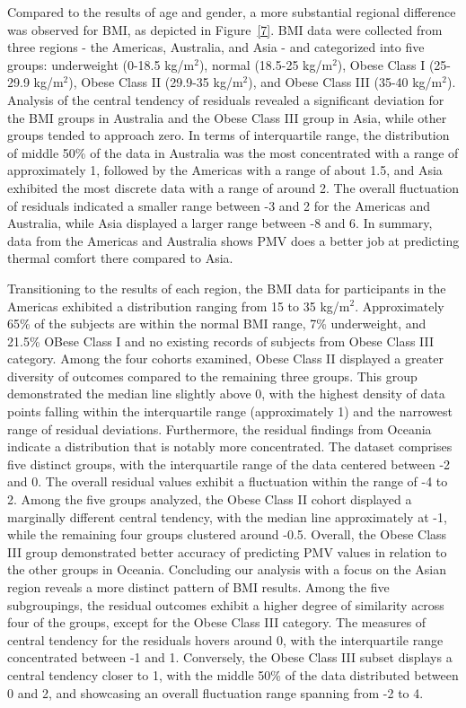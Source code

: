\documentclass[final,3p,times,12pt]{elsarticle}
\begin{document}
Compared to the results of age and gender, a more substantial regional difference was observed for BMI, as depicted in Figure~\ref{7}. BMI data were collected from three regions - the Americas, Australia, and Asia - and categorized into five groups: underweight (0-18.5 kg/m$^2$), normal (18.5-25 kg/m$^2$), Obese Class I (25-29.9 kg/m$^2$), Obese Class II (29.9-35 kg/m$^2$), and Obese Class III (35-40 kg/m$^2$). Analysis of the central tendency of residuals revealed a significant deviation for the BMI groups in Australia and the Obese Class III group in Asia, while other groups tended to approach zero. In terms of interquartile range, the distribution of middle 50\% of the data in Australia was the most concentrated with a range of approximately 1, followed by the Americas with a range of about 1.5, and Asia exhibited the most discrete data with a range of around 2. The overall fluctuation of residuals indicated a smaller range between -3 and 2 for the Americas and Australia, while Asia displayed a larger range between -8 and 6. In summary, data from the Americas and Australia shows PMV does a better job at predicting thermal comfort there compared to Asia.

Transitioning to the results of each region, the BMI data for participants in the Americas exhibited a distribution ranging from 15 to 35 kg/m$^2$. Approximately 65\% of the subjects are within the normal BMI range, 7\% underweight, and 21.5\% OBese Class I and no existing records of subjects from Obese Class III category. Among the four cohorts examined, Obese Class II displayed a greater diversity of outcomes compared to the remaining three groups. This group demonstrated the median line slightly above 0, with the highest density of data points falling within the interquartile range (approximately 1) and the narrowest range of residual deviations. Furthermore, the residual findings from Oceania indicate a distribution that is notably more concentrated. The dataset comprises five distinct groups, with the interquartile range of the data centered between -2 and 0. The overall residual values exhibit a fluctuation within the range of -4 to 2. Among the five groups analyzed, the Obese Class II cohort displayed a marginally different central tendency, with the median line approximately at -1, while the remaining four groups clustered around -0.5. Overall, the Obese Class III group demonstrated better accuracy of predicting PMV values in relation to the other groups in Oceania. Concluding our analysis with a focus on the Asian region reveals a more distinct pattern of BMI results. Among the five subgroupings, the residual outcomes exhibit a higher degree of similarity across four of the groups, except for the Obese Class III category. The measures of central tendency for the residuals hovers around 0, with the interquartile range concentrated between -1 and 1. Conversely, the Obese Class III subset displays a central tendency closer to 1, with the middle 50\% of the data distributed between 0 and 2, and showcasing an overall fluctuation range spanning from -2 to 4.
 
\end{document}
